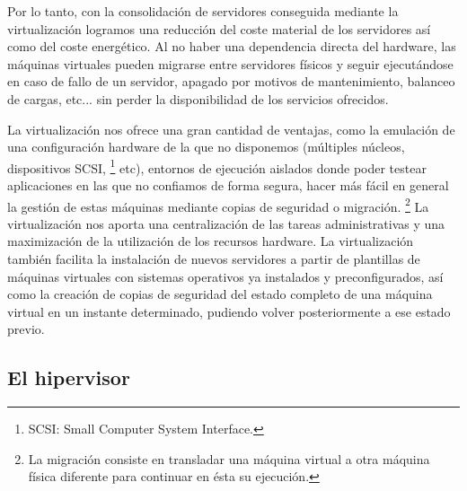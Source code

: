 \documentclass[spanisheDIVcalc,twoside,parskip-,pointlessnumbers,final]{scrbook}
\begin{document}
Por lo tanto, con la consolidación de servidores conseguida mediante
la virtualización logramos una reducción del coste material de los
servidores así como del coste energético. Al no haber una dependencia
directa del hardware, las máquinas virtuales pueden migrarse entre
servidores físicos y seguir ejecutándose en caso de fallo de un servidor,
apagado por motivos de mantenimiento, balanceo de cargas, etc... sin
perder la disponibilidad de los servicios ofrecidos.

La virtualización nos ofrece una gran cantidad de ventajas, como la
emulación de una configuración hardware de la que no disponemos (múltiples
núcleos, dispositivos SCSI,%
\footnote{SCSI: Small Computer System Interface. %
} etc), entornos de ejecución aislados donde poder testear aplicaciones
en las que no confiamos de forma segura, hacer más fácil en general
la gestión de estas máquinas mediante copias de seguridad o migración.%
\footnote{La migración consiste en transladar una máquina virtual a otra máquina
física diferente para continuar en ésta su ejecución.%
} La virtualización nos aporta una centralización de las tareas administrativas
y una maximización de la utilización de los recursos hardware. La
virtualización también facilita la instalación de nuevos servidores
a partir de plantillas de máquinas virtuales con sistemas operativos
ya instalados y preconfigurados, así como la creación de copias de
seguridad del estado completo de una máquina virtual en un instante
determinado, pudiendo volver posteriormente a ese estado previo.


\subsection{El hipervisor}
\end{document}
